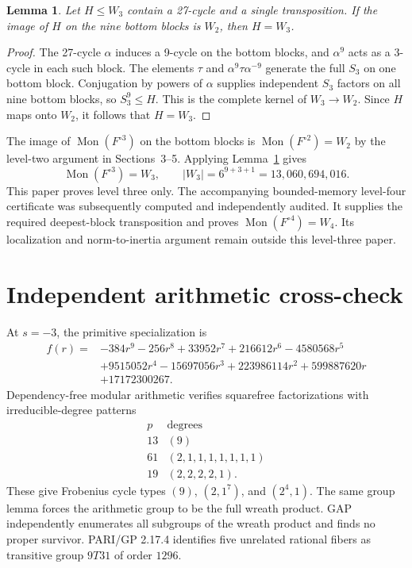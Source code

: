 \documentclass[11pt]{article}
\newtheorem{lemma}[theorem]{Lemma}
\newcommand{\Mon}{\operatorname{Mon}}
\begin{document}
\begin{lemma}\label{lem:w3}
Let $H\leq W_3$ contain a 27-cycle and a single transposition. If the image of
$H$ on the nine bottom blocks is $W_2$, then $H=W_3$.
\end{lemma}
\begin{proof}
The 27-cycle $\alpha$ induces a 9-cycle on the bottom blocks, and $\alpha^9$
acts as a 3-cycle in each such block. The elements $\tau$ and
$\alpha^9\tau\alpha^{-9}$ generate the full $S_3$ on one bottom block.
Conjugation by powers of $\alpha$ supplies independent $S_3$ factors on all
nine bottom blocks, so $S_3^9\leq H$. This is the complete kernel of
$W_3\to W_2$. Since $H$ maps onto $W_2$, it follows that $H=W_3$.
\end{proof}

The image of $\Mon(F^{\circ3})$ on the bottom blocks is
$\Mon(F^{\circ2})=W_2$ by the level-two argument in
Sections~3--5. Applying Lemma~\ref{lem:w3} gives
\[
\Mon(F^{\circ3})=W_3,\qquad
|W_3|=6^{9+3+1}=13{,}060{,}694{,}016.
\]
This paper proves level three only. The accompanying bounded-memory
level-four certificate was subsequently computed and independently audited.
It supplies the required deepest-block transposition and proves
$\Mon(F^{\circ4})=W_4$. Its localization and norm-to-inertia argument remain
outside this level-three paper.

\section{Independent arithmetic cross-check}

At $s=-3$, the primitive specialization is
\begingroup\small
\begin{align*}
f(r)={}&-384r^9-256r^8+33952r^7+216612r^6-4580568r^5\\
&+9515052r^4-15697056r^3+223986114r^2+599887620r\\
&+17172300267.
\end{align*}
\endgroup
Dependency-free modular arithmetic verifies squarefree factorizations with
irreducible-degree patterns
\[
\begin{array}{c|c}
p&\text{degrees}\\ \hline
13&(9)\\
61&(2,1,1,1,1,1,1,1)\\
19&(2,2,2,2,1).
\end{array}
\]
These give Frobenius cycle types $(9)$, $(2,1^7)$, and $(2^4,1)$. The same
group lemma forces the arithmetic group to be the full wreath product. GAP
independently enumerates all subgroups of the wreath product and finds no
proper survivor. PARI/GP 2.17.4 identifies five unrelated rational fibers as
transitive group $9T31$ of order $1296$.
\end{document}
